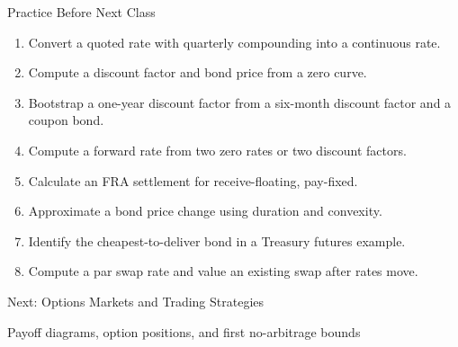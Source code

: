 \documentclass[aspectratio=169,11pt]{beamer}
\begin{document}
\begin{frame}{Practice Before Next Class}
    \begin{enumerate}
        \item Convert a quoted rate with quarterly compounding into a continuous rate.
        \item Compute a discount factor and bond price from a zero curve.
        \item Bootstrap a one-year discount factor from a six-month discount factor and a coupon bond.
        \item Compute a forward rate from two zero rates or two discount factors.
        \item Calculate an FRA settlement for receive-floating, pay-fixed.
        \item Approximate a bond price change using duration and convexity.
        \item Identify the cheapest-to-deliver bond in a Treasury futures example.
        \item Compute a par swap rate and value an existing swap after rates move.
    \end{enumerate}
\end{frame}

\begin{frame}
    \centering
    \vfill
    {Next: Options Markets and Trading Strategies\par}
    \vspace{0.8em}
    {Payoff diagrams, option positions, and first no-arbitrage bounds\par}
    \vfill
\end{frame}
\end{document}
